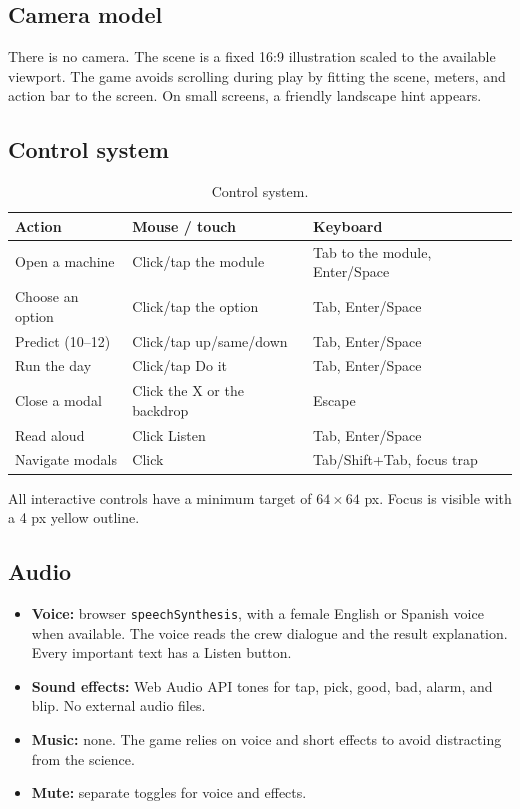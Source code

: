 \documentclass[11pt,a4paper]{article}
\newcommand{\code}[1]{\texttt{#1}}
\begin{document}
\subsection{Camera model}

There is no camera. The scene is a fixed 16:9 illustration scaled to the available viewport. The game avoids scrolling during play by fitting the scene, meters, and action bar to the screen. On small screens, a friendly landscape hint appears.

\subsection{Control system}

\begin{table}[H]
\centering
\small
\begin{tabular}{@{}p{4.0cm}p{5.2cm}p{5.2cm}@{}}
\toprule
\textbf{Action} & \textbf{Mouse / touch} & \textbf{Keyboard}\\
\midrule
Open a machine & Click/tap the module & Tab to the module, Enter/Space\\
Choose an option & Click/tap the option & Tab, Enter/Space\\
Predict (10--12) & Click/tap up/same/down & Tab, Enter/Space\\
Run the day & Click/tap Do it & Tab, Enter/Space\\
Close a modal & Click the X or the backdrop & Escape\\
Read aloud & Click Listen & Tab, Enter/Space\\
Navigate modals & Click & Tab/Shift+Tab, focus trap\\
\bottomrule
\end{tabular}
\caption{Control system.}
\label{tab:controls}
\end{table}

All interactive controls have a minimum target of $64 \times 64$ px. Focus is visible with a 4 px yellow outline.

\subsection{Audio}

\begin{itemize}
  \item \textbf{Voice:} browser \code{speechSynthesis}, with a female English or Spanish voice when available. The voice reads the crew dialogue and the result explanation. Every important text has a Listen button.
  \item \textbf{Sound effects:} Web Audio API tones for tap, pick, good, bad, alarm, and blip. No external audio files.
  \item \textbf{Music:} none. The game relies on voice and short effects to avoid distracting from the science.
  \item \textbf{Mute:} separate toggles for voice and effects.
\end{itemize}
\end{document}
